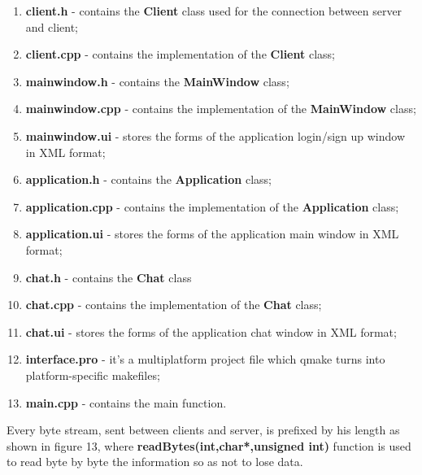 \documentclass[runningheads]{llncs}
\begin{document}
\begin{enumerate}

\item \textbf{client.h} - contains the \textbf{Client} class used for the connection between server and client;
\item \textbf{client.cpp} - contains the implementation of the \textbf{Client} class;
\item \textbf{mainwindow.h} - contains the \textbf{MainWindow} class;
\item \textbf{mainwindow.cpp} -  contains the implementation of the \textbf{MainWindow} class;
\item \textbf{mainwindow.ui} - stores the forms of the application login/sign up window in XML format;
\item \textbf{application.h} - contains the \textbf{Application} class;
\item \textbf{application.cpp} - contains the implementation of the \textbf{Application} class;
\item \textbf{application.ui} - stores the forms of the application main window in XML format;
\item \textbf{chat.h} - contains the \textbf{Chat} class
\item \textbf{chat.cpp} - contains the implementation of the \textbf{Chat} class;
\item \textbf{chat.ui} - stores the forms of the application chat window in XML format;
\item \textbf{interface.pro} - it's a multiplatform project file which qmake turns into platform-specific makefiles;
\item \textbf{main.cpp} - contains the main function.
\end{enumerate}

\par Every byte stream, sent between clients and server, is prefixed by his length as shown in figure 13, where \textbf{readBytes(int,char*,unsigned int)} function is used to read byte by byte the information so as not to lose data. 
\end{document}
